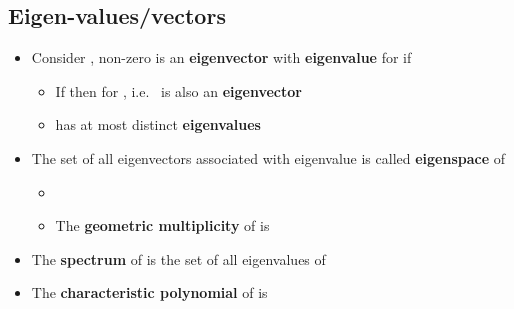 \subsection*{Eigen-values/vectors}

\begin{itemize}

  \item
        Consider , non-zero
         is an \textbf{eigenvector} with
        \textbf{eigenvalue}  for  if

        \begin{itemize}

          \item
                If  then
                 for
                , i.e.~ is also an
                \textbf{eigenvector}
          \item
                 has at most  distinct \textbf{eigenvalues}
        \end{itemize}
  \item
        The set of all eigenvectors associated with eigenvalue \iMbox{\lambda}
        is called \textbf{eigenspace}  of 

        \begin{itemize}

          \item
          \item
                The \textbf{geometric multiplicity} of \iMbox{\lambda} is
        \end{itemize}
  \item
        The \textbf{spectrum}
         of  is
        the set of all eigenvalues of 
  \item
        The \textbf{characteristic polynomial} of  is

        \begin{itemize}


\end{itemize}
\end{itemize}
